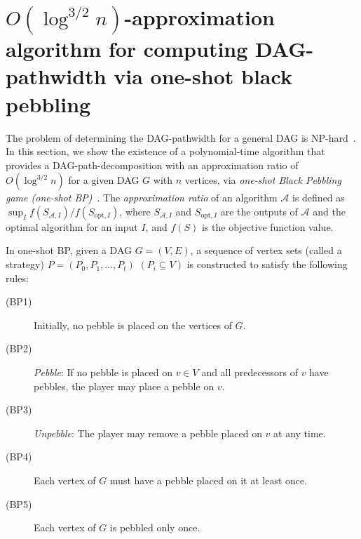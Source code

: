 \documentclass[runningheads]{llncs}
\theoremstyle{plain}
\theoremstyle{definition}
\begin{document}
\section{$O(\log^{3/2} n)$-approximation algorithm for computing DAG-pathwidth via one-shot black pebbling}\label{chapter4}


The problem of determining the DAG-pathwidth for a general DAG is NP-hard~\cite{art12}.
In this section, we show the existence of a polynomial-time algorithm that provides a DAG-path-decomposition with an approximation ratio of $O(\log ^{3/2} n)$ for a given DAG $G$ with $n$ vertices, via \emph{one-shot Black Pebbling game (one-shot BP)}~\cite{art16}.
The \emph{approximation ratio} of an algorithm $\mathcal{A}$ is defined as $\sup_{I}f(S_{\mathcal{A}, I})/f(S_{\mathrm{opt}, I})$, where $S_{\mathcal{A}, I}$ and $S_{\mathrm{opt}, I}$ are the outputs of $\mathcal{A}$ and the optimal algorithm for an input $I$, and $f(S)$ is the objective function value.

In one-shot BP, given a DAG $G = (V, E)$, a sequence of vertex sets (called a strategy) $P = (P_0, P_1, \dots, P_t)$ $(P_i \subseteq V)$ is constructed to satisfy the following rules:
%
\begin{description}
    \item[(BP1)] Initially, no pebble is placed on the vertices of $G$. %
    \item[(BP2)] \emph{Pebble}: If no pebble is placed on $v \in V$ and all predecessors of $v$ have pebbles, the player may place a pebble on $v$. %
    \item[(BP3)] \emph{Unpebble}: The player may remove a pebble placed on $v$ at any time. %
    \item[(BP4)] Each vertex of $G$ must have a pebble placed on it at least once.
    \item[(BP5)] Each vertex of $G$ is pebbled only once.
\end{description}
\end{document}
